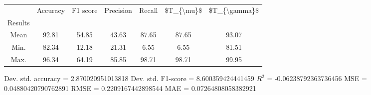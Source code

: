 \begin{tabular}{|c|c|c|c|c|c|c|}
\toprule
{} &  Accuracy &  F1 score &  Precision &  Recall &  \$T\_\{\textbackslash mu\}\$ &  \$T\_\{\textbackslash gamma\}\$ \\
Results &           &           &            &         &            &               \\
\hline
Mean    &     92.81 &     54.85 &      43.63 &   87.65 &      87.65 &         93.07 \\
Min.    &     82.34 &     12.18 &      21.31 &    6.55 &       6.55 &         81.51 \\
Max.    &     96.34 &     64.19 &      85.85 &   98.71 &      98.71 &         99.95 \\
\bottomrule
\end{tabular}

 Dev. std. accuracy = 2.870020951013818
 Dev. std. F1-score = 8.600359424441459
 $R^2$ = -0.06238792363736456
 MSE = 0.04880420790762891
 RMSE = 0.2209167442898544
 MAE = 0.07264808058382921